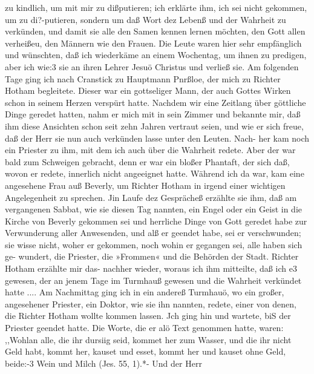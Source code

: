 zu kindlich, um mit mir zu dißputieren; ich erklärte ihm, ich sei
nicht gekommen, um zu di?-putieren, sondern um daß Wort dez
Lebenß und der Wahrheit zu verkünden, und damit sie alle den
Samen kennen lernen möchten, den Gott allen verheißeu, den
Männern wie den Frauen. Die Leute waren hier sehr empfänglich
und wünschten, daß ich wiederkäme an einem Wochentag, um
ihnen zu predigen, aber ich wie:3 sie an ihren Lehrer Jesuö
Christus und verließ sie. Am folgenden Tage ging ich nach
Cranstick zu Hauptmann Pnrßloe, der mich zu Richter Hotham
begleitete. Dieser war ein gottseliger Mann, der auch Gottes
Wirken schon in seinem Herzen verspürt hatte. Nachdem wir eine
Zeitlang über göttliche Dinge geredet hatten, nahm er mich mit
in sein Zimmer und bekannte mir, daß ihm diese Ansichten
schon seit zehn Jahren vertraut seien, und wie er sich freue, daß
der Herr sie nun auch verkünden lasse unter den Leuten. Nach-
her kam noch ein Priester zu ihm, mit dem ich auch über die
Wahrheit redete. Aber der war bald zum Schweigen gebracht,
denn er war ein bloßer Phantaft, der sich daß, wovon er redete,
innerlich nicht angeeignet hatte.
Während ich da war, kam eine angesehene Frau auß Beverly,
um Richter Hotham in irgend einer wichtigen Angelegenheit zu
sprechen. Jin Laufe dez Gesprächeß erzählte sie ihm, daß am
vergangenen Sabbat, wie sie diesen Tag nannten, ein Engel oder
ein Geist in die Kirche von Beverly gekommen sei und herrliche
Dinge von Gott geredet habe zur Verwunderung aller Anwesenden,
und alß er geendet habe, sei er verschwunden; sie wisse nicht, woher
er gekommen, noch wohin er gegangen sei, alle haben sich ge-
wundert, die Priester, die »Frommen« und die Behörden der Stadt.
Richter Hotham erzählte mir das- nachher wieder, woraus ich ihm
mitteilte, daß ich e3 gewesen, der an jenem Tage im Turmhauß
gewesen und die Wahrheit verkündet hatte ....
Am Nachmittag ging ich in ein andereß Turmhauö, wo ein
großer, angesehener Priester, ein Doktor, wie sie ihn nannten,
redete, einer von denen, die Richter Hotham wollte kommen lassen.
Jch ging hin und wartete, biS der Priester geendet hatte. Die
Worte, die er alö Text genommen hatte, waren: ,,Wohlan alle,
die ihr dursiig seid, kommet her zum Wasser, und die ihr nicht
Geld habt, kommt her, kauset und esset, kommt her und kauset
ohne Geld, beide:-3 Wein und Milch (Jes. 55, 1).*- Und der Herr


